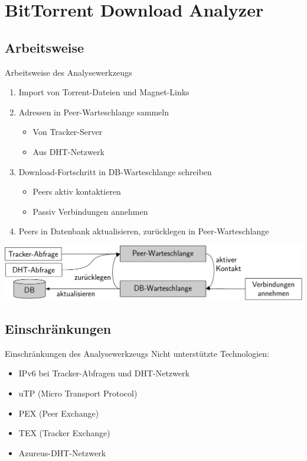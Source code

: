 \documentclass[dvipsnames]{beamer} %
\begin{document}
	\section{BitTorrent Download Analyzer}

	\subsection{Arbeitsweise}
	\begin{frame}{Arbeitsweise des Analysewerkzeugs}
		\begin{enumerate}
			\item \alert{Import} von Torrent-Dateien und Magnet-Links
			\item \alert{Adressen} in Peer-Warteschlange sammeln
			\begin{itemize}
				\item Von Tracker-Server
				\item Aus DHT-Netzwerk
			\end{itemize}
			\item \alert{Download-Fortschritt} in DB-Warteschlange schreiben
			\begin{itemize}
				\item Peers aktiv kontaktieren
				\item Passiv Verbindungen annehmen
			\end{itemize}
			\item Peers in \alert{Datenbank} aktualisieren, zurücklegen in Peer-Warteschlange
		\end{enumerate}

		\vspace{0.5cm}
    \includegraphics[width=\textwidth]{Komponenten-crop}
	\end{frame}


	\subsection{Einschränkungen}
	\begin{frame}{Einschränkungen des Analysewerkzeugs}
		Nicht unterstützte Technologien:

		\begin{itemize}
			\item IPv6 bei Tracker-Abfragen und DHT-Netzwerk
			\item uTP (Micro Transport Protocol)
			\item PEX (Peer Exchange)
			\item TEX (Tracker Exchange)
			\item Azureus-DHT-Netzwerk
		\end{itemize}
	\end{frame}
\end{document}
